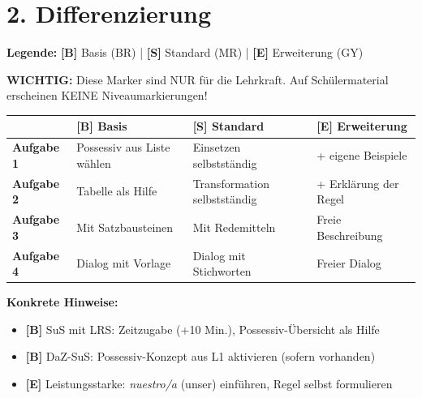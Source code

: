 \documentclass[11pt, a4paper]{article}
\newcommand{\B}{\textcolor{basis}{\textbf{[B]}}}
\newcommand{\Std}{\textcolor{standard}{\textbf{[S]}}}
\newcommand{\E}{\textcolor{erweiterung}{\textbf{[E]}}}
\begin{document}

\section*{2. Differenzierung}

\begin{differenzierung}
\textbf{Legende:} \B{} Basis (BR) | \Std{} Standard (MR) | \E{} Erweiterung (GY)

\vspace{0.5em}

\textbf{WICHTIG:} Diese Marker sind NUR für die Lehrkraft. Auf Schülermaterial erscheinen KEINE Niveaumarkierungen!
\end{differenzierung}

\vspace{1em}

\begin{tabularx}{\textwidth}{|l|X|X|X|}
\hline
& \B{} \textbf{Basis} & \Std{} \textbf{Standard} & \E{} \textbf{Erweiterung} \\
\hline
\textbf{Aufgabe 1} & Possessiv aus Liste wählen & Einsetzen selbstständig & + eigene Beispiele \\
\hline
\textbf{Aufgabe 2} & Tabelle als Hilfe & Transformation selbstständig & + Erklärung der Regel \\
\hline
\textbf{Aufgabe 3} & Mit Satzbausteinen & Mit Redemitteln & Freie Beschreibung \\
\hline
\textbf{Aufgabe 4} & Dialog mit Vorlage & Dialog mit Stichworten & Freier Dialog \\
\hline
\end{tabularx}

\vspace{1em}

\textbf{Konkrete Hinweise:}
\begin{itemize}
    \item \B{} SuS mit LRS: Zeitzugabe (+10 Min.), Possessiv-Übersicht als Hilfe
    \item \B{} DaZ-SuS: Possessiv-Konzept aus L1 aktivieren (sofern vorhanden)
    \item \E{} Leistungsstarke: \textit{nuestro/a} (unser) einführen, Regel selbst formulieren
\end{itemize}

\end{document}
